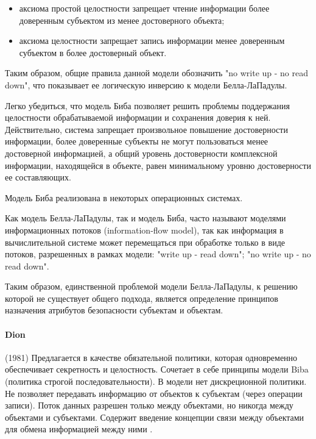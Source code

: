 \begin{itemize}
	\item аксиома простой целостности запрещает чтение информации более доверенным субъектом из менее достоверного объекта; 
	\item аксиома целостности запрещает запись информации менее доверенным субъектом в более достоверный объект. 
\end{itemize}

Таким образом, общие правила данной модели обозначить "no write up - no read down", что показывает ее логическую инверсию к модели Белла-ЛаПадулы. 

Легко убедиться, что модель Биба позволяет решить проблемы поддержания целостности обрабатываемой информации и сохранения доверия к ней. Действительно, система запрещает произвольное повышение достоверности информации, более доверенные субъекты не могут пользоваться менее достоверной информацией, а общий уровень достоверности комплексной информации, находящейся в объекте, равен минимальному уровню достоверности ее составляющих. 

Модель Биба реализована в некоторых операционных системах. 

Как модель Белла-ЛаПадулы, так и модель Биба, часто называют моделями информационных потоков (information-flow model), так как информация в вычислительной системе может перемещаться при обработке только в виде потоков, разрешенных в рамках модели: "write up - read down"; "no write up - no read down". 

Таким образом, единственной проблемой модели Белла-ЛаПадулы, к решению которой не существует общего подхода, является определение принципов назначения атрибутов безопасности субъектам и объектам. 

\paragraph{Dion}

(1981) Предлагается в качестве обязательной политики, которая одновременно обеспечивает секретность и целостность. 
Сочетает в себе принципы модели Biba (политика строгой последовательности). В модели нет дискреционной 
политики. Не позволяет передавать информацию от объектов к субъектам (через операции записи). Поток данных 
разрешен только между объектами, но никогда между объектами и субъектами. Содержит введение концепции связи между 
объектами для обмена информацией между ними \autocite{Jalili2}.

